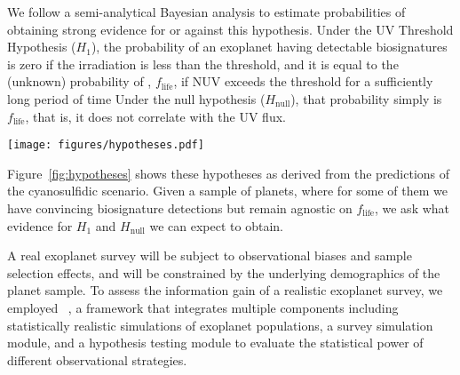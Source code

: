 \documentclass[twocolumn,twocolappendix,linenumbers]{aastex631}
\begin{document}
We follow a semi-analytical Bayesian analysis to estimate probabilities of obtaining strong evidence for or against this hypothesis.
Under the UV Threshold Hypothesis ($H_1$), the probability of an exoplanet having detectable biosignatures is zero if the  irradiation is less than the threshold, and it is equal to the (unknown) probability of , $f_\mathrm{life}$, if \gls{NUV} exceeds the threshold for a sufficiently long period of time 
Under the null hypothesis ($H_\mathrm{null}$), that probability simply is $f_\mathrm{life}$, that is, it does not correlate with the \gls{UV} flux.

\begin{figure*}
    \begin{centering}
        \texttt{[image: figures/hypotheses.pdf]}
        \caption{UV~Threshold Hypothesis and null hypothesis derived from the cyanosulfidic scenario.}
        \label{fig:hypotheses}
    \end{centering}
\end{figure*}
Figure~\ref{fig:hypotheses} shows these hypotheses as derived from the predictions of the cyanosulfidic scenario.
Given a sample of planets, where for some of them we have convincing biosignature detections but remain agnostic on $f_\mathrm{life}$, we ask what evidence for $H_1$ and $H_\mathrm{null}$ we can expect to obtain.

A real exoplanet survey will be subject to observational biases and sample selection effects, and will be constrained by the underlying demographics of the planet sample.
To assess the information gain of a realistic exoplanet survey, we employed \bioverse~\citep{Bixel2021,Hardegree-Ullman2023,Schlecker2024,Hardegree-Ullman2024}, a framework that integrates multiple components including statistically realistic simulations of exoplanet populations, a survey simulation module, and a hypothesis testing module to evaluate the statistical power of different observational strategies.
\end{document}
